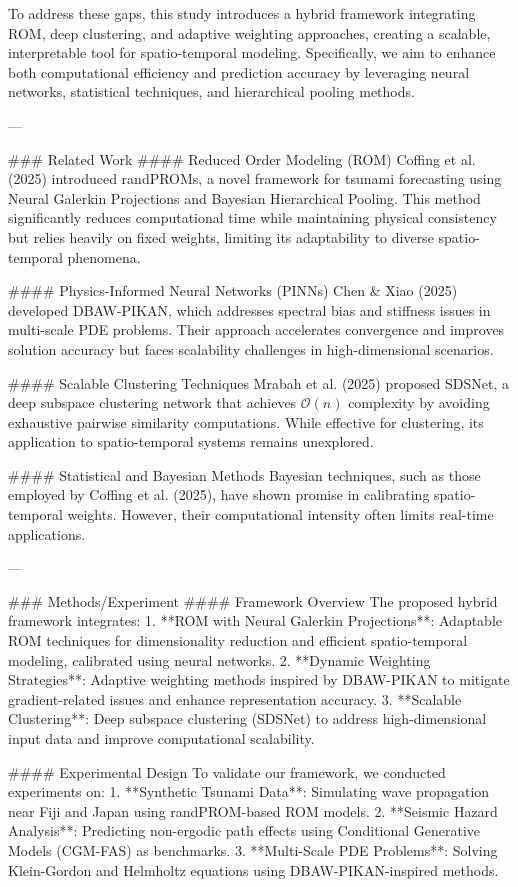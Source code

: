 To address these gaps, this study introduces a hybrid framework integrating ROM, deep clustering, and adaptive weighting approaches, creating a scalable, interpretable tool for spatio-temporal modeling. Specifically, we aim to enhance both computational efficiency and prediction accuracy by leveraging neural networks, statistical techniques, and hierarchical pooling methods.

---

### Related Work
#### Reduced Order Modeling (ROM)
Coffing et al. (2025) introduced randPROMs, a novel framework for tsunami forecasting using Neural Galerkin Projections and Bayesian Hierarchical Pooling. This method significantly reduces computational time while maintaining physical consistency but relies heavily on fixed weights, limiting its adaptability to diverse spatio-temporal phenomena.

#### Physics-Informed Neural Networks (PINNs)
Chen & Xiao (2025) developed DBAW-PIKAN, which addresses spectral bias and stiffness issues in multi-scale PDE problems. Their approach accelerates convergence and improves solution accuracy but faces scalability challenges in high-dimensional scenarios.

#### Scalable Clustering Techniques
Mrabah et al. (2025) proposed SDSNet, a deep subspace clustering network that achieves \( \mathcal{O}(n) \) complexity by avoiding exhaustive pairwise similarity computations. While effective for clustering, its application to spatio-temporal systems remains unexplored.

#### Statistical and Bayesian Methods
Bayesian techniques, such as those employed by Coffing et al. (2025), have shown promise in calibrating spatio-temporal weights. However, their computational intensity often limits real-time applications.

---

### Methods/Experiment
#### Framework Overview
The proposed hybrid framework integrates:
1. **ROM with Neural Galerkin Projections**: Adaptable ROM techniques for dimensionality reduction and efficient spatio-temporal modeling, calibrated using neural networks.
2. **Dynamic Weighting Strategies**: Adaptive weighting methods inspired by DBAW-PIKAN to mitigate gradient-related issues and enhance representation accuracy.
3. **Scalable Clustering**: Deep subspace clustering (SDSNet) to address high-dimensional input data and improve computational scalability.

#### Experimental Design
To validate our framework, we conducted experiments on:
1. **Synthetic Tsunami Data**: Simulating wave propagation near Fiji and Japan using randPROM-based ROM models.
2. **Seismic Hazard Analysis**: Predicting non-ergodic path effects using Conditional Generative Models (CGM-FAS) as benchmarks.
3. **Multi-Scale PDE Problems**: Solving Klein-Gordon and Helmholtz equations using DBAW-PIKAN-inspired methods.

